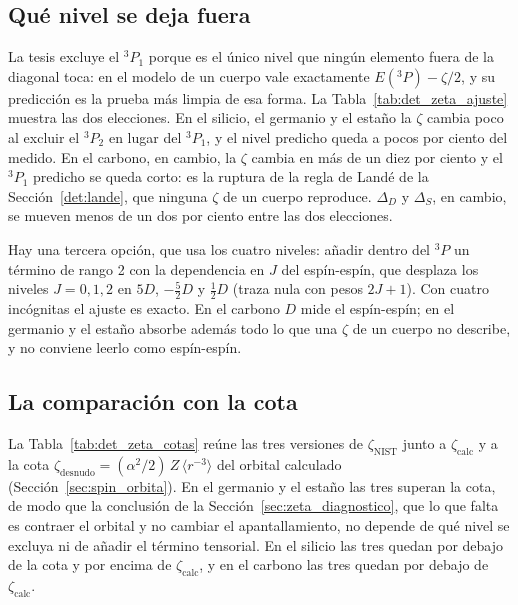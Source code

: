 \documentclass[11pt,a4paper]{article}
\begin{document}
\subsection{Qué nivel se deja fuera}

La tesis excluye el $^3P_1$ porque es el único nivel que ningún elemento fuera de la diagonal toca:
en el modelo de un cuerpo vale exactamente $E(^3P) - \zeta/2$, y su predicción es la prueba más
limpia de esa forma. La Tabla~\ref{tab:det_zeta_ajuste} muestra las dos elecciones. En el silicio,
el germanio y el estaño la $\zeta$ cambia poco al excluir el $^3P_2$ en lugar del $^3P_1$, y el
nivel predicho queda a pocos por ciento del medido. En el carbono, en cambio, la $\zeta$ cambia en
más de un diez por ciento y el $^3P_1$ predicho se queda corto: es la ruptura de la regla de Landé
de la Sección~\ref{det:lande}, que ninguna $\zeta$ de un cuerpo reproduce. $\Delta_D$ y $\Delta_S$,
en cambio, se mueven menos de un dos por ciento entre las dos elecciones.

\begin{table}[htbp]
  \centering\small
  
  \caption{El ajuste que define $\zeta_{\text{NIST}}$ (cm$^{-1}$), con cada uno de los dos
  niveles del triplete excluido. $\zeta^{(0)}$ es la estimación $LS$ de partida con el nivel del
  triplete que sí entra al ajuste; $\Delta_D$, $\Delta_S$ y $\zeta$ son la solución, y las dos
  últimas columnas comparan el nivel excluido predicho con el medido. La primera fila de cada
  elemento es la $\zeta_{\text{NIST}}$ de la tesis.}
  \label{tab:det_zeta_ajuste}
\end{table}

Hay una tercera opción, que usa los cuatro niveles: añadir dentro del $^3P$ un término de rango 2
con la dependencia en $J$ del espín-espín, que desplaza los niveles $J = 0, 1, 2$ en $5D$,
$-\tfrac{5}{2}D$ y $\tfrac{1}{2}D$ (traza nula con pesos $2J+1$). Con cuatro incógnitas el
ajuste es exacto. En el carbono $D$ mide el espín-espín; en el germanio y el estaño absorbe además
todo lo que una $\zeta$ de un cuerpo no describe, y no conviene leerlo como espín-espín.

\subsection{La comparación con la cota}

La Tabla~\ref{tab:det_zeta_cotas} reúne las tres versiones de $\zeta_{\text{NIST}}$ junto a
$\zeta_{\text{calc}}$ y a la cota $\zeta_{\text{desnudo}} = (\alpha^2/2)\,Z\,\langle r^{-3}\rangle$
del orbital calculado (Sección~\ref{sec:spin_orbita}). En el germanio y el estaño las tres superan
la cota, de modo que la conclusión de la Sección~\ref{sec:zeta_diagnostico}, que lo que falta es
contraer el orbital y no cambiar el apantallamiento, no depende de qué nivel se excluya ni de
añadir el término tensorial. En el silicio las tres quedan por debajo de la cota y por encima de
$\zeta_{\text{calc}}$, y en el carbono las tres quedan por debajo de $\zeta_{\text{calc}}$.
\end{document}
